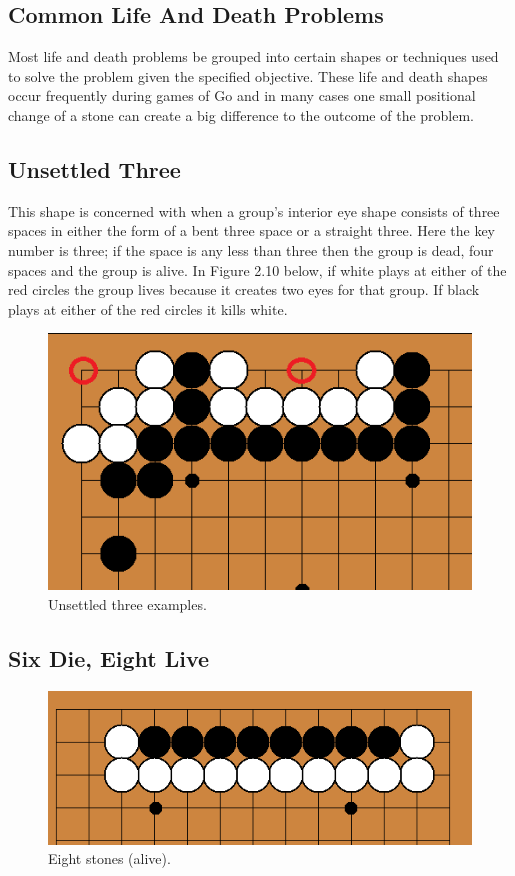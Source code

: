 \documentclass{l3proj}
\begin{document}
\subsection{Common Life And Death Problems}

Most life and death problems be grouped into certain shapes or techniques used to solve the problem given the specified objective. These life and death shapes occur frequently during games of Go and in many cases one small positional change of a stone can create a big difference to the outcome of the problem.

\subsection{Unsettled Three}

This shape is concerned with when a group's interior eye shape consists of three spaces in either the form of a bent three space or a straight three. Here the key number is three; if the space is any less than three then the group is dead, four spaces and the group is alive. In Figure 2.10 below, if white plays at either of the red circles the group lives because it creates two eyes for that group. If black plays at either of the red circles it kills white.

\begin{figure}[H]
\centering
\includegraphics[scale=0.5]{Images/unsettled3.png}
\caption{Unsettled three examples.}
\end{figure}

\subsection{Six Die, Eight Live}

\begin{figure}[H]
\centering
\includegraphics[scale=0.5]{Images/eightlive.png}
\caption{Eight stones (alive).}
\end{figure}
\end{document}
